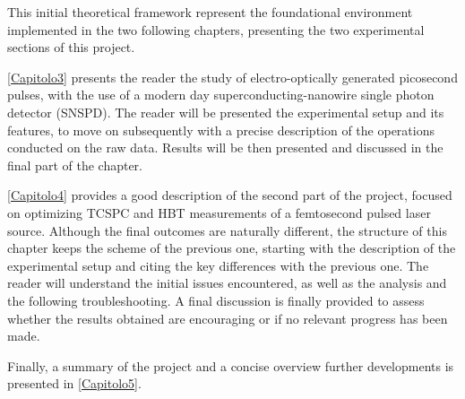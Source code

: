 This initial theoretical framework represent the foundational environment implemented in the two following chapters, presenting the two experimental sections of this project.

\autoref{Capitolo3} presents the reader the study of electro-optically generated picosecond pulses, with the use of a modern day superconducting-nanowire single photon detector (SNSPD).
The reader will be presented the experimental setup and its features, to move on subsequently with a precise description of the operations conducted on the raw data. Results will be then presented and discussed in the final part of the chapter.


\autoref{Capitolo4} provides a good description of the second part of the project, focused on optimizing TCSPC and HBT measurements of a femtosecond pulsed laser source.
Although the final outcomes are naturally different, the structure of this chapter keeps the scheme of the previous one, starting with the description of the experimental setup and citing the key differences with the previous one.
The reader will understand the initial issues encountered, as well as the analysis and the following troubleshooting.
A final discussion is finally provided to assess whether the results obtained are encouraging or if no relevant progress has been made.

Finally, a summary of the project and a concise overview further developments is presented in \autoref{Capitolo5}.









%
